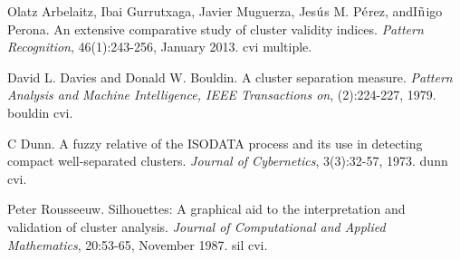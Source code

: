 \documentclass{article}
\begin{document}
\thispagestyle{empty}
\begin{thebibliography}{12}
	 Olatz Arbelaitz, Ibai Gurrutxaga, Javier Muguerza, Jes$\rm\acute{u}$s M. P$\rm\acute{e}$rez, andI$\rm\tilde{n}$igo Perona. An extensive comparative study of cluster validity indices. {\it Pattern Recognition}, 46(1):243-256, January 2013. cvi multiple.

	 David L. Davies and Donald W. Bouldin. A cluster separation measure. {\it Pattern Analysis and Machine Intelligence, IEEE Transactions on}, (2):224-227, 1979. bouldin cvi.

	 C Dunn. A fuzzy relative of the ISODATA process and its use in detecting compact well-separated clusters. {\it Journal of Cybernetics}, 3(3):32-57, 1973. dunn cvi.
	
	 Peter Rousseeuw. Silhouettes: A graphical aid to the interpretation and validation of cluster analysis. {\it Journal of Computational and Applied Mathematics}, 20:53-65, November 1987. sil cvi.
\end{thebibliography}
\end{document}
